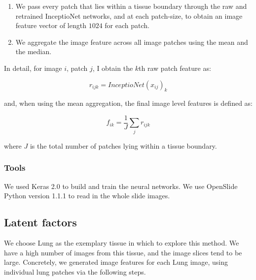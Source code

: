 \documentclass{article}
\begin{document}
\begin{enumerate}
\item We pass every patch that lies within a tissue boundary through the raw and retrained InceptioNet networks, and at each patch-size, to obtain an image feature vector of length $1024$ for each patch.
 \item We aggregate the image feature across all image patches using the mean and the median.
\end{enumerate}
In detail, for image $i$, patch $j$, I obtain the $k$th raw patch feature as:

$$r_{ijk} =  InceptioNet(x_{ij})_k$$

and, when using the mean aggregation, the final image level features is defined as:

$$f_{ik} = \frac{1}{J}\sum_j r_{ijk}$$

where $J$ is the total number of patches lying within a tissue boundary.




\subsubsection{Tools}
We used Keras 2.0 \cite{keras} to build and train the neural networks. We use OpenSlide Python \cite{openslide}  version 1.1.1 to read in the whole slide images.

\subsection{Latent factors}

We choose Lung as the exemplary tissue in which to explore this method. We have a high number of images from this tissue, and the image slices tend to be large. Concretely, we generated image features for each Lung image, using individual lung patches via the following steps.
\end{document}
